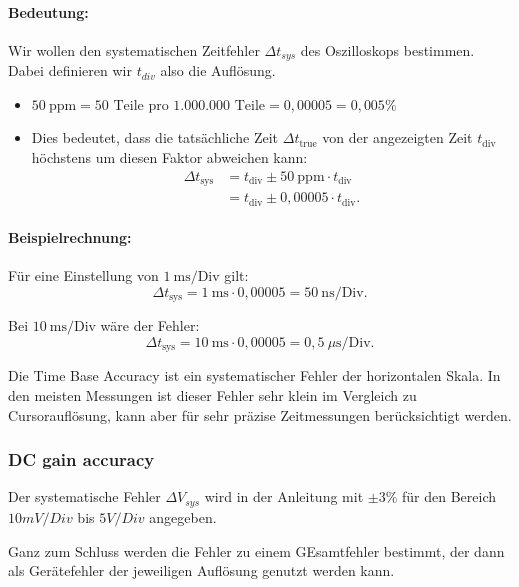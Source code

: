 \paragraph{Bedeutung:} 

Wir wollen den systematischen Zeitfehler $\Delta t_{sys}$ des Oszilloskops bestimmen. Dabei definieren wir $t_{div}$ also die Auflösung.

\begin{itemize}
    \item \(50~\text{ppm} = 50 \text{ Teile pro 1.000.000 Teile} = 0,00005 = 0,005\%\)
    \item Dies bedeutet, dass die tatsächliche Zeit \(\Delta t_\text{true}\) von der angezeigten Zeit \(t_\text{div}\) höchstens um diesen Faktor abweichen kann:
    \begin{align}
        \Delta t_\text{sys} &=t_\text{div} \pm 50~\text{ppm} \cdot t_\text{div} \\
        &=t_\text{div} \pm 0,00005 \cdot t_\text{div}.
    \end{align}
\end{itemize}

\paragraph{Beispielrechnung:} Für eine Einstellung von \(1~\text{ms/Div}\) gilt:
\begin{equation}
    \Delta t_\text{sys}
    = 1~\text{ms} \cdot 0,00005
    = 50~\text{ns/Div}.
\end{equation}

Bei \(10~\text{ms/Div}\) wäre der Fehler:
\begin{equation}
\Delta t_\text{sys} = 10~\text{ms} \cdot 0,00005 = 0,5~\mu\text{s/Div}.
\end{equation}

Die Time Base Accuracy ist ein systematischer Fehler der horizontalen Skala. In den meisten Messungen ist dieser Fehler sehr klein im Vergleich zu Cursorauflösung, kann aber für sehr präzise Zeitmessungen berücksichtigt werden.

\subsubsection*{DC gain accuracy}
Der systematische Fehler $\Delta V_{sys}$ wird in der Anleitung mit $\pm 3\%$ für den Bereich $10mV/Div$ bis $5V/Div$ angegeben. 

Ganz zum Schluss werden die Fehler zu einem GEsamtfehler bestimmt, der dann als Gerätefehler der jeweiligen Auflösung genutzt werden kann.

